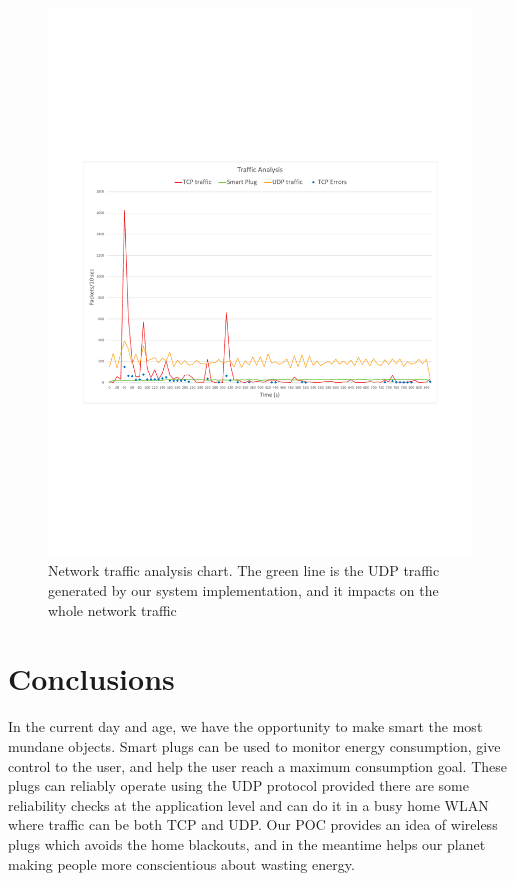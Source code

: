 \documentclass[conference]{IEEEtran}
\begin{document}
	\begin{figure}[htbp]
		\centering
		\includegraphics[width=\linewidth]{assets/grafico}
		\caption{Network traffic analysis chart. The green line is the UDP  traffic generated by our system implementation, and it impacts on the whole network traffic}
		\label{fig:grafico}
	\end{figure}
	
	
	\section{Conclusions}
	In the current day and age, we have the opportunity to make smart the most mundane objects. Smart plugs can be used to monitor energy consumption, give control to the user, and help the user reach a maximum consumption goal. These plugs can reliably operate using the UDP protocol provided there are some reliability checks at the application level and can do it in a busy home WLAN where traffic can be both TCP and UDP.
	Our POC provides an idea of wireless plugs which avoids the home blackouts, and in the meantime helps our planet making people more conscientious about wasting energy.
	{}
	
	
\end{document}
